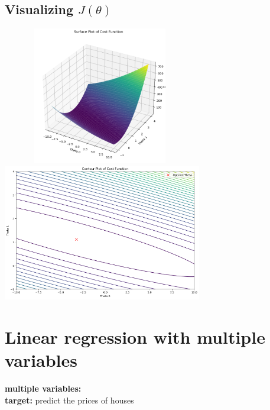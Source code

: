 \documentclass[a4paper, 12pt]{book}
\begin{document}
		\subsection{Visualizing $J(\theta)$}
		\ \ \ \ \ \ \ 
	\includegraphics[height=6cm,keepaspectratio]{surface} \ \ \ \ \ \ \ \ \ \ \ \ \ \ \ \ \
	\includegraphics[height=6cm,keepaspectratio]{contour}
	
	\section{Linear regression with multiple variables}
	\textbf{multiple variables: } \\
	\textbf{target: } predict the prices of  houses
\end{document}
